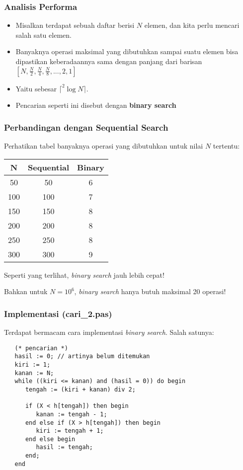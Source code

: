 \documentclass{beamer}
\begin{document}
\begin{frame}
\frametitle{Analisis Performa}
\begin{itemize}
    \item Misalkan terdapat sebuah daftar berisi $N$ elemen, dan kita perlu mencari salah satu elemen.
    \item Banyaknya operasi maksimal yang dibutuhkan sampai suatu elemen bisa dipastikan keberadaannya sama dengan panjang dari barisan $[N, \frac{N}{2}, \frac{N}{4}, \frac{N}{8}, ..., 2, 1]$
    \item Yaitu sebesar $\lceil ^2\log{N} \rceil$.
    \item Pencarian seperti ini disebut dengan \alert{\textbf{binary search}}
\end{itemize}
\end{frame}

\begin{frame}
\frametitle{Perbandingan dengan Sequential Search}
Perhatikan tabel banyaknya operasi yang dibutuhkan untuk nilai $N$ tertentu:
\begin{table}[ht]
    \begin{tabular}{|c|c|c|}
        \hline N  & Sequential  & Binary \\
        \hline 50 & 50 & 6 \\
        \hline 100 & 100 & 7 \\
        \hline 150 & 150 & 8 \\
        \hline 200 & 200 & 8 \\
        \hline 250 & 250 & 8 \\
        \hline 300 & 300 & 9 \\
        \hline
    \end{tabular}
\end{table}
Seperti yang terlihat, \textit{binary search} jauh lebih cepat!

Bahkan untuk $N = 10^6$, \textit{binary search} hanya butuh maksimal 20 operasi!
\end{frame}

\begin{frame}[fragile]
\frametitle{Implementasi (cari\_2.pas)}
Terdapat bermacam cara implementasi \textit{binary search}. Salah satunya:
\begin{lstlisting}
   (* pencarian *)
   hasil := 0; // artinya belum ditemukan
   kiri := 1;
   kanan := N;
   while ((kiri <= kanan) and (hasil = 0)) do begin
      tengah := (kiri + kanan) div 2;

      if (X < h[tengah]) then begin
         kanan := tengah - 1;
      end else if (X > h[tengah]) then begin
         kiri := tengah + 1;
      end else begin
         hasil := tengah;
      end;
   end
\end{lstlisting}
\end{frame}
\end{document}
